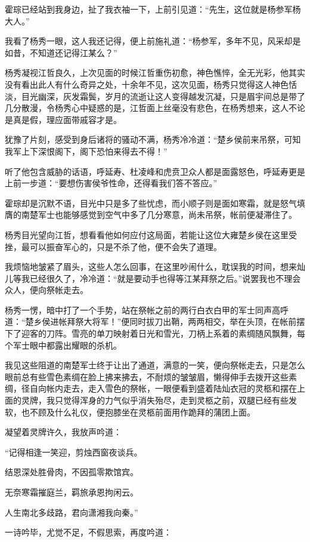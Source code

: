 霍琮已经站到我身边，扯了我衣袖一下，上前引见道：“先生，这位就是杨参军杨大人。”

我看了杨秀一眼，这人我还记得，便上前施礼道：“杨参军，多年不见，风采却是如昔，不知道还记得江某么？”

杨秀凝视江哲良久，上次见面的时候江哲重伤初愈，神色憔悴，全无光彩，他其实没有看出此人有什么奇异之处，十余年不见，这次见面，杨秀只觉得这人神色恬淡，目光幽深，灰发霜鬓，岁月的流逝让这人变得越发沉凝，只是眉宇间总是带了几分散漫，令杨秀心中疑惑的是，江哲面上丝毫没有悲色，在杨秀想来，这人不论是真是假，理应面带戚容才是。

犹豫了片刻，感受到身后诸将的骚动不满，杨秀冷冷道：“楚乡侯前来吊祭，可知我军上下深恨阁下，阁下恐怕来得去不得！”

听了他包含威胁的话语，呼延寿、杜凌峰和虎贲卫众人都是面露怒色，呼延寿更是上前一步道：“要想伤害侯爷性命，还得看我们答不答应。”

霍琮却是沉默不语，目光中只是多了些忧虑，而小顺子则是面如寒霜，就是怒气填膺的南楚军士也能够感觉到空气中多了几分寒意，尚未吊祭，帐前便凝滞住了。

杨秀目光望向江哲，想看看他如何应付这局面，若能让这位大雍楚乡侯在这里受挫，最可以振奋军心的，只是不杀了他，便不会失了道理。

我烦恼地皱紧了眉头，这些人怎么回事，在这里吵闹什么，耽误我的时间，想来灿儿等我已经很久了，冷冷道：“就是要动手也得等江某拜祭之后。”说罢我也不理会众人，便向祭帐走去。

杨秀一愣，暗中打了一个手势，站在祭帐之前的两行白衣白甲的军士同声高呼道：“楚乡侯进帐拜祭大将军！”便同时拔刀出鞘，两两相交，举在头顶，在帐前摆下了迎客的刀阵。雪亮的单刀映射着日光和雪光，刀柄上系着的素绸随风飘舞，每个军士眼中都露出耀眼的杀机。

我见这些阻道的南楚军士终于让出了通道，满意的一笑，便向祭帐走去，只是怎么眼前总有些雪色素绸在脸上拂来拂去，不耐烦的皱皱眉，懒得伸手去拨开这些素绸，径自向帐内走去，走入雪色的祭帐，一眼便看到盛着陆灿衣冠的灵柩和摆在上面的灵牌，我只觉得浑身的力气似乎消失殆尽，走到灵柩之前，双腿已经有些发软，也不顾及什么礼仪，便抱膝坐在灵柩前面用作跪拜的蒲团上面。

凝望着灵牌许久，我放声吟道：

“记得相逢一笑迎，剪烛西窗夜谈兵。

结恩深处胜骨肉，不因孤零欺馆宾。

无奈寒霜摧庭兰，羁旅承恩拘闲云。

人生南北多歧路，君向潇湘我向秦。”

一诗吟毕，尤觉不足，不假思索，再度吟道：

